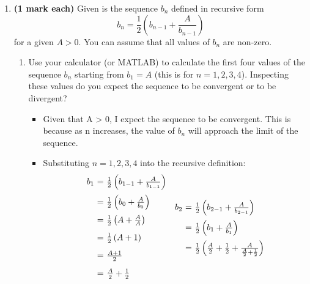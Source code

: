 \documentclass[12pt]{report}
\begin{document}
\begin{enumerate}[leftmargin=\labelsep]
    \item {\bf (1 mark each)} Given is the sequence $b_n$ defined in recursive form
        \begin{equation*}
            b_n=\frac{1}{2}\left(b_{n-1}+\frac{A}{b_{n-1}} \right)
        \end{equation*} for a given $A>0$. You can assume that all values of $b_n$ are non-zero.
        \begin{enumerate}
            \item Use your calculator (or MATLAB) to calculate the first four values of the sequence $b_n$ starting from $b_1=A$ (this is for $n=1,2,3,4$). Inspecting these values do you expect the sequence to be convergent or to be divergent?
                \begin{tcolorbox}
                    \begin{itemize}[label={}]
                        \item Given that A > 0, I expect the sequence to be convergent. This is because as n increases, the value of $b_n$ will approach the limit of the sequence.
                        \item Substituting $n=1,2,3,4$ into the recursive definition:
                        \begin{equation*}
                            \begin{array}{r@{~=~}l}
                                b_{1} & \frac{1}{2}\left(b_{1-1}+\frac{A}{b_{1-1}} \right) \\ [2ex]
                                & \frac{1}{2}\left(b_{0}+\frac{A}{b_{0}} \right) \\ [2ex]
                                & \frac{1}{2}\left(A+\frac{A}{A} \right) \\ [2ex]
                                & \frac{1}{2}\left(A+1 \right) \\ [2ex]
                                & \frac{A+1}{2} \\ [2ex]
                                & \frac{A}{2}+\frac{1}{2} \\ [2ex]
                            \end{array}
                            \begin{array}{r@{~=~}l}
                                b_{2} & \frac{1}{2}\left(b_{2-1}+\frac{A}{b_{2-1}} \right) \\ [2ex]
                                & \frac{1}{2}\left(b_{1}+\frac{A}{b_{1}} \right) \\ [2ex]
                                & \frac{1}{2}\left(\frac{A}{2}+\frac{1}{2}+\frac{A}{\frac{A}{2}+\frac{1}{2}} \right) \\ [2ex]

\end{array}
\end{equation*}
\end{itemize}
\end{tcolorbox}
\end{enumerate}
\end{enumerate}
\end{document}

